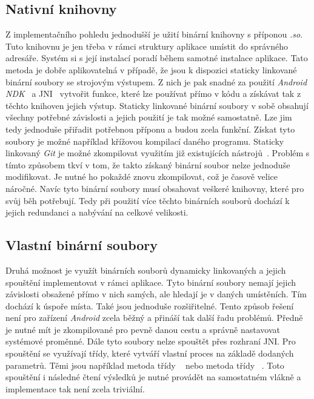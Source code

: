     \subsection{Nativní knihovny}
    Z implementačního pohledu jednodušší je užití binární knihovny s příponou \emph{.so}. Tuto knihovnu je jen třeba v rámci struktury aplikace umístit do správného adresáře. Systém si s její instalací poradí během samotné instalace aplikace. Tato metoda je dobře aplikovatelná v případě, že jsou k dispozici staticky linkované binární soubory se strojovým výstupem. Z nich je pak snadné za použití \emph{Android NDK}~ a JNI~ vytvořit funkce, které lze používat přímo v kódu a získávat tak z těchto knihoven jejich výstup. Staticky linkované binární soubory v sobě obsahují všechny potřebné závislosti a jejich použití je tak možné samostatně. Lze jim tedy jednoduše přiřadit potřebnou příponu a budou zcela funkční. Získat tyto soubory je možné například křížovou kompilací daného programu. Staticky linkovaný \emph{Git} je možné zkompilovat využitím již existujících nástrojů~. Problém s tímto způsobem tkví v tom, že takto získaný binární soubor nelze jednoduše modifikovat. Je nutné ho pokaždé znovu zkompilovat, což je časově velice náročné. Navíc tyto binární soubory musí obsahovat veškeré knihovny, které pro svůj běh potřebují. Tedy při použití více těchto binárních souborů dochází k jejich redundanci a nabývání na celkové velikosti.

    \newpage
    \subsection{Vlastní binární soubory}\label{subsec:dyn_binaries}
    Druhá možnost je využít binárních souborů dynamicky linkovaných a jejich spouštění implementovat v rámci aplikace. Tyto binární soubory nemají jejich závislosti obsažené přímo v nich samých, ale hledají je v daných umístěních. Tím dochází k úspoře místa. Také jsou jednoduše rozšiřitelné. Tento způsob řešení není pro zařízení \emph{Android} zcela běžný a přináší tak další řadu problémů. Předně je nutné mít je zkompilované pro pevně danou cestu a správně nastavovat systémové proměnné. Dále tyto soubory nelze spouštět přes rozhraní JNI. Pro spouštění se využívají třídy, které vytváří vlastní proces na základě dodaných parametrů. Těmi jsou například metoda  třídy ~ nebo metoda  třídy ~. Toto spouštění i následné čtení výsledků je nutné provádět na samostatném vlákně a implementace tak není zcela triviální.


